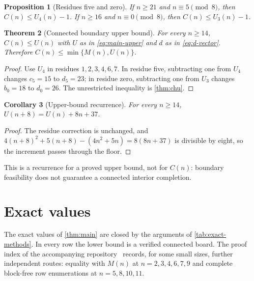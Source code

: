 \documentclass[10pt]{article}
\newtheorem{theorem}{Theorem}[section]
\newtheorem{proposition}[theorem]{Proposition}
\newtheorem{corollary}[theorem]{Corollary}
\theoremstyle{remark}
\begin{document}
\begin{proposition}[Residues five and zero]\label{prop:residue}
If $n\ge21$ and $n\equiv5\pmod8$, then $C(n)\le U_4(n)-1$.  If $n\ge16$ and
$n\equiv0\pmod8$, then $C(n)\le U_3(n)-1$.
\end{proposition}

\begin{theorem}[Connected boundary upper bound]\label{thm:upper}
For every $n\ge14$, $C(n)\le U(n)$ with $U$ as in \eqref{eq:main-upper} and $d$
as in \eqref{eq:d-vector}.  Therefore $C(n)\le\min\{M(n),U(n)\}$.
\end{theorem}

\begin{proof}
Use $U_4$ in residues $1,2,3,4,6,7$.  In residue five, subtracting one from
$U_4$ changes $c_5=15$ to $d_5=23$; in residue zero, subtracting one from $U_3$
changes $b_0=18$ to $d_0=26$.  The unrestricted inequality is \cref{thm:chu}.
\end{proof}

\begin{corollary}[Upper-bound recurrence]\label{cor:U-recurrence}
For every $n\ge14$, $U(n+8)=U(n)+8n+37$.
\end{corollary}

\begin{proof}
The residue correction is unchanged, and $4(n+8)^2+5(n+8)-(4n^2+5n)=8(8n+37)$
is divisible by eight, so the increment passes through the floor.
\end{proof}

This is a recurrence for a proved upper bound, not for $C(n)$: boundary
feasibility does not guarantee a connected interior completion.

\section{Exact values}\label{sec:exact}

The exact values of \cref{thm:main} are closed by the arguments of
\cref{tab:exact-methods}.  In every row the lower bound is a verified connected
board.  The proof index of the accompanying repository~\cite{repo} records, for
some small sizes, further independent routes: equality with $M(n)$ at
$n=2,3,4,6,7,9$ and complete block-free row enumerations at $n=5,8,10,11$.
\end{document}
